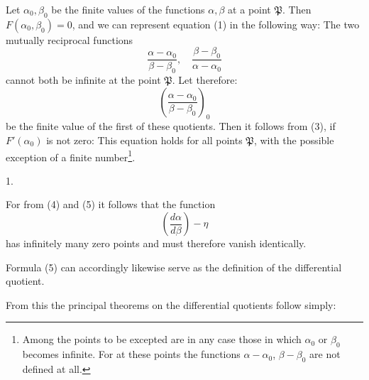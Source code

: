 
Let $\alpha_0, \beta_0$ be the finite values of the functions $\alpha, \beta$ at a point $\mathfrak{P}$. Then $F(\alpha_0, \beta_0) = 0$, and we can represent equation (1) in the following way:
The two mutually reciprocal functions
\[
\frac{\alpha - \alpha_0}{\beta - \beta_0}, \quad \frac{\beta - \beta_0}{\alpha - \alpha_0}
\]
cannot both be infinite at the point $\mathfrak{P}$. Let therefore:
\[
\left(\frac{\alpha - \alpha_0}{\beta - \beta_0}\right)_0
\]
be the finite value of the first of these quotients. Then it follows from (3), if $F'(\alpha_0)$ is not zero:
This equation holds for all points $\mathfrak{P}$, with the possible exception of a finite number\footnote{Among the points to be excepted are in any case those in which $\alpha_0$ or $\beta_0$ becomes infinite. For at these points the functions $\alpha - \alpha_0$, $\beta - \beta_0$ are not defined at all.}.

1. 

For from (4) and (5) it follows that the function
\[
\left(\frac{d\alpha}{d\beta}\right) - \eta
\]
has infinitely many zero points and must therefore vanish identically.

Formula (5) can accordingly likewise serve as the definition of the differential quotient.

From this the principal theorems on the differential quotients follow simply:
